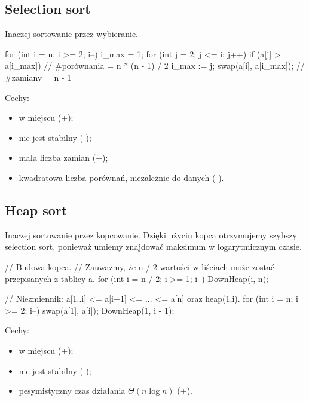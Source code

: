 \subsection{Selection sort}
Inaczej sortowanie przez wybieranie.
\begin{cpp}
    for (int i = n; i >= 2; i--) {
        i_max = 1;
        for (int j = 2; j <= i; j++) {
            if (a[j] > a[i_max])   // #porównania = n * (n - 1) / 2
                i_max := j;
        }
        swap(a[i], a[i_max]);  // #zamiany = n - 1
    }
\end{cpp}
Cechy:
\begin{itemize}
    \item w miejscu (+);
    \item nie jest stabilny (-);
    \item mała liczba zamian (+);
    \item kwadratowa liczba porównań, niezależnie do danych (-).
\end{itemize}

\subsection{Heap sort}
Inaczej sortowanie przez kopcowanie. Dzięki użyciu kopca otrzymujemy szybszy selection sort, ponieważ umiemy znajdować maksimum w logarytmicznym czasie.
\begin{cpp}
    // Budowa kopca.
    // Zauważmy, że n / 2 wartości w liściach może zostać przepisanych z tablicy a.
    for (int i = n / 2; i >= 1; i--)
        DownHeap(i, n);

    // Niezmiennik: a[1..i] <= a[i+1] <= ... <= a[n] oraz heap(1,i).
    for (int i = n; i >= 2; i--) {
        swap(a[1], a[i]);
        DownHeap(1, i - 1);
    }
\end{cpp}
Cechy:
\begin{itemize}
    \item w miejscu (+);
    \item nie jest stabilny (-);
    \item pesymistyczny czas działania $\Theta(n \log n)$ (+).
\end{itemize}

